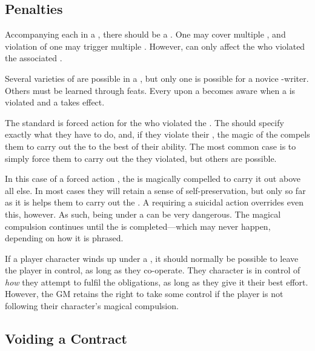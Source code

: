 \subsection{Penalties}

Accompanying each {\stipulation} in a {\contract}, there should be a {\contractpenalty}.
One {\contractpenalty} may cover multiple {\stipulations}, and violation of one {\stipulation} may trigger multiple {\penalties}.
However, {\penalties} can only affect the {\signatories} who violated the associated {\stipulations}.

Several varieties of {\contractpenalty} are possible in a {\contract}, but only one is possible for a novice {\contract}-writer.
Others must be learned through feats.
Every {\signatory} upon a {\contract} becomes aware when a {\stipulation} is violated and a {\contractpenalty} takes effect.

The standard {\contractpenalty} is forced action for the {\signatory} who violated the {\stipulation}.
The {\contract} should specify exactly what they have to do, and, if they violate their {\stipulation}, the magic of the {\contract} compels them to carry out the {\contractpenalty} to the best of their ability.
The most common case is to simply force them to carry out the {\stipulation} they violated, but others are possible.

In this case of a forced action {\contractpenalty}, the {\penalised} {\signatory} is magically compelled to carry it out above all else.
In most cases they will retain a sense of self-preservation, but only so far as it is helps them to carry out the {\contractpenalty}.
A {\contractpenalty} requiring a suicidal action overrides even this, however.
As such, being under a {\contractpenalty} can be very dangerous.
The magical compulsion continues until the {\contractpenalty} is completed---which may never happen, depending on how it is phrased.

If a player character winds up under a {\contractpenalty}, it should normally be possible to leave the player in control, as long as they co-operate.
They character is in control of \emph{how} they attempt to fulfil the {\penaltypossessive} obligations, as long as they give it their best effort.
However, the GM retains the right to take some control if the player is not following their character's magical compulsion.

\subsection{Voiding a Contract}


